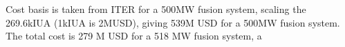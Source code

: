 Cost basis is taken from ITER for a 500MW fusion system, scaling the 269.6kIUA (1kIUA is 2MUSD), giving 539M USD for a 500MW fusion system. The total cost is 279 M USD for a 518 MW fusion system, a






